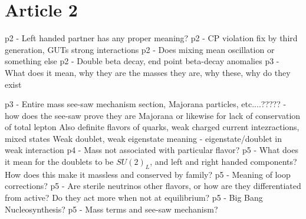 \documentclass[11 pt, twoside]{article}
\newenvironment{outline*}
{
	\begin{outline}[enumerate]
	}
	{\end{outline}
}
\begin{document}
\section{Article 2}
\begin{outline*}
\1 p2 - Left handed partner has any proper meaning?
\1 p2 - CP violation fix by third generation, GUTs strong interactions
\1 p2 - Does mixing mean oscillation or something else
\1 p2 - Double beta decay, end point beta-decay anomalies
\1 p3 - What does it mean, why they are the masses they are, why these, why do they exist

\1 p3 - Entire mass see-saw mechanism section, Majorana particles, etc....????? - how does the see-saw prove they are Majorana or likewise for lack of conservation of total lepton
\2 Also definite flavors of quarks, weak charged current intezractions, mixed states
\2 Weak doublet, weak eigenstate meaning - eigenstate/doublet in weak interaction
\1 p4 - Mass not associated with particular flavor?
\1 p5 - What does it mean for the doublets to be $SU(2)_L$, and left and right handed components? How does this make it massless and conserved by family?
\1 p5 - Meaning of loop corrections?
\1 p5 - Are sterile neutrinos other flavors, or how are they differentiated from active? Do they act more when not at equilibrium?
\1 p5 - Big Bang Nucleosynthesis?
\1 p5 - Mass terms and see-saw mechanism?
\end{outline*}
\end{document}
